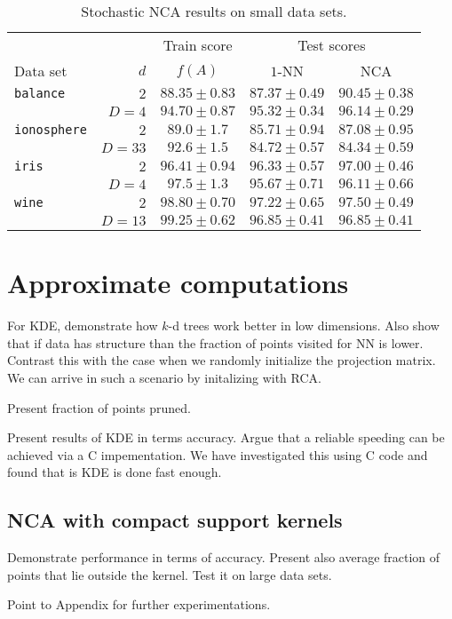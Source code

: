 \begin{description}
{    \begin{table}
      \centering\begin{tabular}{lrccc}
      \toprule
	      &     & Train score  & \multicolumn{2}{c}{Test scores}\\
      \cmidrule(r){3-3} \cmidrule(r){4-5}
      Data set & $d$ & $f(A)$ & $1$-NN & NCA \\
      \midrule
	\texttt{balance}&$2$&$88.35 \pm 0.83$&$87.37 \pm 0.49$&$90.45 \pm 0.38$\\  
	&$D=4$&$94.70 \pm 0.87$&$95.32 \pm 0.34$&$96.14 \pm 0.29$\\ 
	\midrule
	\texttt{ionosphere}&$2$&$89.0 \pm 1.7$&$85.71 \pm 0.94$&$87.08 \pm 0.95$\\
	&$D=33$&$92.6 \pm 1.5$&$84.72 \pm 0.57$&$84.34 \pm 0.59$\\ 
	\midrule
	\texttt{iris}&$2$&$96.41 \pm 0.94$&$96.33 \pm 0.57$&$97.00 \pm 0.46$\\ 
	&$D=4$&$97.5 \pm 1.3$&$95.67 \pm 0.71$&$96.11 \pm 0.66$\\ 
	\midrule
	\texttt{wine}&$2$&$98.80 \pm 0.70$&$97.22 \pm 0.65$&$97.50 \pm 0.49$\\ 
	&$D=13$&$99.25 \pm 0.62$&$96.85 \pm 0.41$&$96.85 \pm 0.41$\\ 
      \bottomrule
      \end{tabular}
      \caption{\small Stochastic NCA results on small data sets.}
    \end{table}
    }
\end{description}


\section{Approximate computations}
\label{sec:eval-nca-approx}

For KDE, demonstrate how $k$-d trees work better in low dimensions. Also show that if data has structure than the fraction of points visited for NN is lower. Contrast this with the case when we randomly initialize the projection matrix. We can arrive in such a scenario by initalizing with RCA.

Present fraction of points pruned.

Present results of KDE in terms accuracy. Argue that a reliable speeding can be achieved via a C impementation. We have investigated this using C code and found that is KDE is done fast enough.

\subsection*{NCA with compact support kernels}
\label{subsec:eval-nca-cs}

Demonstrate performance in terms of accuracy. Present also average fraction of points that lie outside the kernel. Test it on large data sets.

Point to Appendix for further experimentations.